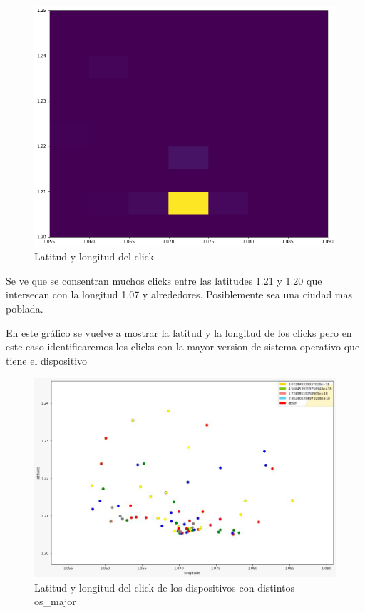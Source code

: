 \documentclass[a4paper, 12pt]{article}
\newcommand\tab[1][1cm]{\hspace*{#1}}
\begin{document}
		\FloatBarrier
		\begin{figure}[h]
			\centering
			\includegraphics[width=\textwidth]{images/clicks/clicks_lat_long_heat.png}
			\caption{Latitud y longitud del click}
		\end{figure}
		\FloatBarrier


		\tab Se ve que se consentran muchos clicks entre las latitudes 1.21 y 1.20 que intersecan con la longitud 1.07 y alrededores. Posiblemente sea una ciudad mas poblada.

		
		\tab En este gráfico se vuelve a mostrar la latitud y la longitud de los clicks pero en este caso identificaremos los clicks con la mayor version de sistema operativo que tiene el dispositivo
		
		\FloatBarrier
		\begin{figure}[h]
			\centering
			\includegraphics[width=\textwidth]{images/clicks/clicks_lat_long_major_OS.png}
			\caption{Latitud y longitud del click de los dispositivos con distintos os_major}
		\end{figure}
		\FloatBarrier
\end{document}
